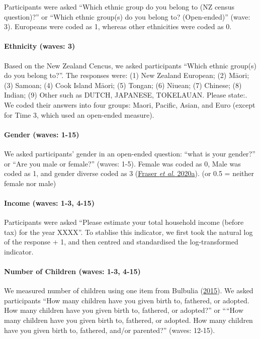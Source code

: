 \documentclass[
  singlecolumn,
  9pt]{article}
\let\oldparagraph\paragraph
\renewcommand{\paragraph}[1]{\oldparagraph{#1}\mbox{}}
\begin{document}
Participants were asked ``Which ethnic group do you belong to (NZ census
question)?'' or ``Which ethnic group(s) do you belong to? (Open-ended)''
(wave: 3). Europeans were coded as 1, whereas other ethnicities were
coded as 0.

\paragraph{Ethnicity (waves: 3)}\label{ethnicity-waves-3}

Based on the New Zealand Cencus, we asked participants ``Which ethnic
group(s) do you belong to?''. The responses were: (1) New Zealand
European; (2) Māori; (3) Samoan; (4) Cook Island Māori; (5) Tongan; (6)
Niuean; (7) Chinese; (8) Indian; (9) Other such as DUTCH, JAPANESE,
TOKELAUAN. Please state:. We coded their answers into four groups:
Maori, Pacific, Asian, and Euro (except for Time 3, which used an
open-ended measure).

\paragraph{Gender (waves: 1-15)}\label{gender-waves-1-15}

We asked participants' gender in an open-ended question: ``what is your
gender?'' or ``Are you male or female?'' (waves: 1-5). Female was coded
as 0, Male was coded as 1, and gender diverse coded as 3
(\hyperref[ref-fraser_coding_2020]{Fraser \emph{et al.} 2020a}). (or 0.5
= neither female nor male)

\paragraph{Income (waves: 1-3, 4-15)}\label{income-waves-1-3-4-15}

Participants were asked ``Please estimate your total household income
(before tax) for the year XXXX''. To stablise this indicator, we first
took the natural log of the response + 1, and then centred and
standardised the log-transformed indicator.

\paragraph{Number of Children (waves: 1-3,
4-15)}\label{number-of-children-waves-1-3-4-15}

We measured number of children using one item from Bulbulia
(\hyperref[ref-Bulbulia_2015]{2015}). We asked participants ``How many
children have you given birth to, fathered, or adopted. How many
children have you given birth to, fathered, or adopted?'' or ````How
many children have you given birth to, fathered, or adopted. How many
children have you given birth to, fathered, and/or parented?'' (waves:
12-15).
\end{document}

